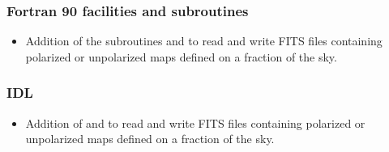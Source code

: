\documentclass[12pt,twoside]{article}
\newcommand{\linklatexhtml}[3]{%
\latexhtml{\htmladdnormallink{#1}{#2}}{\htmladdnormallink{#1}{#3}}}
\begin{document}
\subsubsection[Fortran 90]{Fortran 90 facilities and subroutines}
\begin{itemize}
    \item Addition of the subroutines
     and 
    to read and write FITS files containing polarized or unpolarized maps defined on a fraction of the sky.
\end{itemize}
%
\subsubsection[IDL]{IDL}
\begin{itemize}
   \item Addition of 
     and 
    to read and write FITS files containing polarized or unpolarized maps defined on a fraction of the sky.
\end{itemize}
%


%
\end{document}
